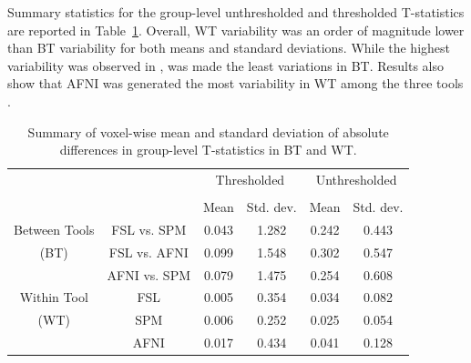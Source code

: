 \documentclass[conference]{IEEEtran}
\begin{document}
Summary statistics for the group-level unthresholded and thresholded T-statistics  are reported in Table~\ref{table:pipeline-stats}.
Overall, WT variability was an order of magnitude lower than BT variability for both means and standard deviations.
While the highest variability was observed in \fslafni, \fslspm was made the least variations in BT.
Results also show that AFNI was generated the most variability in WT among the three tools .


\setlength{\tabcolsep}{7pt}
\begin{table}[h]
    \centering
    \begin{tabular}{cccc|cc}
        \toprule
        \multirow{2}{*}{}& {} & \multicolumn{2}{c}{Thresholded} & \multicolumn{2}{c}{Unthresholded} \\
        \cmidrule{3-4} \cmidrule{5-6} \\
        {} & {} & Mean & Std. dev. & Mean & Std. dev. \\
        \midrule
        \rowcolor{lightgray}
        {Between Tools} & FSL vs. SPM        &  0.043       & 1.282      & 0.242     & 0.443  \\
        \rowcolor{lightgray}
        {(BT)} & FSL vs. AFNI         &  0.099       & 1.548      & 0.302     & 0.547  \\
        \rowcolor{lightgray}
        {} & AFNI vs. SPM         &  0.079       & 1.475      & 0.254     & 0.608  \\
        {Within Tool} & FSL    &  0.005       & 0.354      & 0.034     & 0.082  \\
        {(WT)}   & SPM    &  0.006       & 0.252      & 0.025     & 0.054  \\
        {}   & AFNI   &  0.017       & 0.434      & 0.041     & 0.128  \\
        \bottomrule
    \end{tabular}
    \caption{Summary of voxel-wise mean and standard deviation of absolute differences in group-level T-statistics in BT and WT. }
    \label{table:pipeline-stats}
\end{table}


\end{document}
